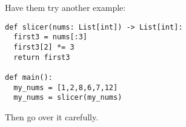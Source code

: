 \documentclass{article}
\newcommand{\eg}{\emph{e.g.}\xspace}
\newenvironment{reflect}[1]
{
  \noindent
  \begin{lrbox}{\reflectbox}
    \begin{minipage}[t]{\textwidth}
      \textbf{#1}:
}{
    \end{minipage}
  \end{lrbox}
  \fbox{\usebox{\reflectbox}}
}
\begin{document}
Have them try another example:

\begin{verbatim}
def slicer(nums: List[int]) -> List[int]:
  first3 = nums[:3]
  first3[2] *= 3
  return first3

def main():
  my_nums = [1,2,8,6,7,12]
  my_nums = slicer(my_nums)
\end{verbatim}

Then go over it carefully.

\newpage




\end{document}
